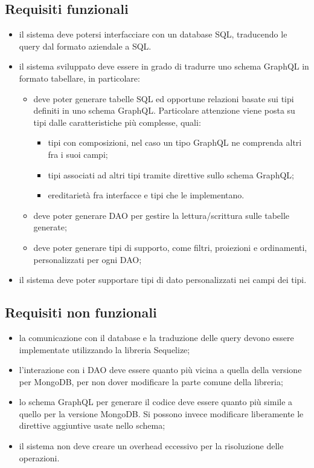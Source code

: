 \documentclass[a4paper, 12pt]{report}
\begin{document}
      \subsection{Requisiti funzionali}
        \begin{itemize}
          \item il sistema deve potersi interfacciare con un database SQL, traducendo le query dal formato aziendale a SQL.
          \item il sistema sviluppato deve essere in grado di tradurre uno schema GraphQL in formato tabellare, in particolare:
          \begin{itemize}
            \item deve poter generare tabelle SQL ed opportune relazioni basate sui tipi definiti in uno schema GraphQL. Particolare attenzione viene posta su tipi dalle caratteristiche più complesse, quali:
            \begin{itemize}
              \item tipi con composizioni, nel caso un tipo GraphQL ne comprenda altri fra i suoi campi;
              \item tipi associati ad altri tipi tramite direttive sullo schema GraphQL;
              \item ereditarietà fra interfacce e tipi che le implementano.
            \end{itemize}
            \item deve poter generare DAO per gestire la lettura/scrittura sulle tabelle generate;
            \item deve poter generare tipi di supporto, come filtri, proiezioni e ordinamenti, personalizzati per ogni DAO;
          \end{itemize}
          \item il sistema deve poter supportare tipi di dato personalizzati nei campi dei tipi.
        \end{itemize}
      \subsection{Requisiti non funzionali}
        \begin{itemize}
          \item la comunicazione con il database e la traduzione delle query devono essere implementate utilizzando la libreria Sequelize;
          \item l'interazione con i DAO deve essere quanto più vicina a quella della versione per MongoDB, per non dover modificare la parte comune della libreria;
          \item lo schema GraphQL per generare il codice deve essere quanto più simile a quello per la versione MongoDB. Si possono invece modificare liberamente le direttive aggiuntive usate nello schema;
          \item il sistema non deve creare un overhead eccessivo per la risoluzione delle operazioni.
        \end{itemize}
  \newpage
  
\end{document}
